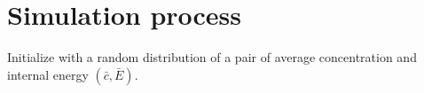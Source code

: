 

\section{Simulation process}

Initialize with a random distribution of a pair of average concentration and
internal energy $(\bar{c}, \bar{E})$.





\newpage


\newpage

\newpage






